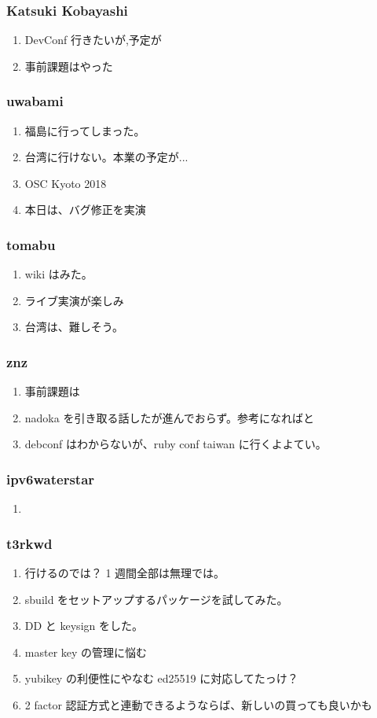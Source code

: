 \documentclass[cjk,dvipdfmx,10pt,compress,%
hyperref={bookmarks=true,bookmarksnumbered=true,bookmarksopen=false,%
colorlinks=false,%
pdftitle={第 132 回 関西 Debian 勉強会},%
pdfauthor={かわだ},%
pdfsubject={資料},%
}]{beamer}
\begin{document}

\begin{frame}
  \frametitle{ Katsuki Kobayashi }
  \begin{enumerate}
	\item DevConf 行きたいが,予定が
	\item 事前課題はやった
  \end{enumerate}
\end{frame}

\begin{frame}
  \frametitle{uwabami}
  \begin{enumerate}
		  \item 福島に行ってしまった。
		  \item 台湾に行けない。本業の予定が...  
		\item OSC Kyoto 2018
		\item 本日は、バグ修正を実演
  \end{enumerate}
\end{frame}

\begin{frame}
  \frametitle{tomabu }
  \begin{enumerate}
		  \item wiki はみた。
		\item ライブ実演が楽しみ
		\item 台湾は、難しそう。
  \end{enumerate}
\end{frame}

\begin{frame}
  \frametitle{ znz}
  \begin{enumerate}
		  \item 事前課題は
		\item nadoka を引き取る話したが進んでおらず。参考になればと
		\item debconf はわからないが、ruby conf taiwan に行くよよてい。
  \end{enumerate}
\end{frame}
 
\begin{frame}
  \frametitle{ipv6waterstar}
  \begin{enumerate}
		  \item
  \end{enumerate}
\end{frame}
 
\begin{frame}
  \frametitle{t3rkwd}
  \begin{enumerate}
	  \item 行けるのでは？ 1 週間全部は無理では。
   		\item sbuild をセットアップするパッケージを試してみた。
		\item DD と keysign をした。
        \item master key の管理に悩む
		\item yubikey の利便性にやなむ ed25519 に対応してたっけ？
		\item 2 factor 認証方式と連動できるようならば、新しいの買っても良いかも
  \end{enumerate}
\end{frame}
\end{document}
